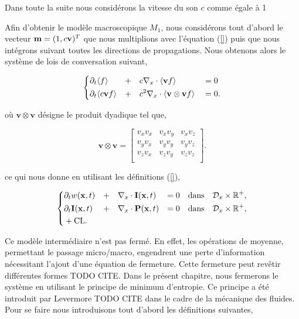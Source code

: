\begin{remark}
  Dans toute la suite nous considérons la vitesse du son $c$ comme égale à 1
\end{remark}

Afin d'obtenir le modèle macroscopique $M_1$, nous considérons tout d'abord le  vecteur  $\mathbf{m} = (1, c\mathbf{v})^T$ que nous multiplions avec l'équation (\ref{}) puis que nous intégrons suivant toutes les directions de propagations. Nous obtenons  alors le système de lois de conversation suivant,


\begin{equation}
  \left\{
  \begin{aligned}
  &\partial_t \langle f      \rangle& + & &&c\nabla_{x} \cdot 
  \langle \mathbf{v} f \rangle& &= 0 \\
  &\partial_t \langle c\mathbf{v} f \rangle& + & &&c^2\nabla_{x} \cdot 
  \langle \mathbf{v} \otimes \mathbf{v} f \rangle& &= 0.
  \end{aligned}
  \right.
\end{equation}

où $\mathbf{v} \otimes \mathbf{v}$ désigne le produit dyadique tel que, 

\begin{equation}
  \mathbf{v} \otimes \mathbf{v} = 
  \begin{bmatrix}
  v_x v_x & v_x v_y & v_x v_z \\
  v_y v_x & v_y v_y & v_y v_z \\
  v_z v_x & v_z v_y & v_z v_z \\
  \end{bmatrix}.
\end{equation}

ce qui nous donne en utilisant les définitions (\ref{}), 

\begin{equation}
  \label{eq:sysh}
  \left\{
  \begin{aligned}
  & \partial_t w(\mathbf{x},t)& &+& &\nabla_x \cdot \mathbf{I}(\mathbf{x},t) &= 0 
  \quad \mbox{dans} \quad \mathcal{D}_x \times \mathbb{R}^+,\\
  &\partial_t \mathbf{I}(\mathbf{x},t)& &+& &\nabla_x \cdot \mathbf{P}(\mathbf{x},t) &=0 
  \quad \mbox{dans} \quad \mathcal{D}_x \times \mathbb{R}^+,\\
  &+ \mbox{CL}.
  \end{aligned}
  \right.
\end{equation}


Ce modèle intermédiaire n'est pas fermé. En effet, les opérations de moyenne, permettant le passage micro/macro, engendrent une perte d'information  nécessitant l'ajout d'une équation de fermeture. Cette fermeture peut revêtir différentes formes TODO CITE. Dans le présent chapitre, nous fermerons le  système en utilisant le principe de minimum d'entropie. Ce principe a été  introduit par Levermore TODO CITE dans le cadre de la mécanique des fluides. 
Pour se faire nous introduisons tout d'abord les définitions suivantes,


